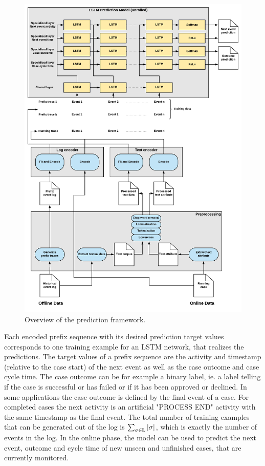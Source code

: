 \begin{figure}[!htbp]
	\includegraphics[width=\textwidth]{figures/framework}
	\caption{Overview of the prediction framework.}
	\label{fig:framework}
\end{figure}

Each encoded prefix sequence with its desired prediction target values corresponds to one training example for an LSTM network, that realizes the predictions. 
The target values of a prefix sequence are the activity and timestamp (relative to the case start) of the next event as well as the case outcome and case cycle time.
The case outcome can be for example a binary label, ie. a label telling if the case is successful or has failed or if it has been approved or declined.
In some applications the case outcome is defined by the final event of a case.
For completed cases the next activity is an artificial "PROCESS END" activity with the same timestamp as the final event.
The total number of training examples that can be generated out of the log is $\sum_{\sigma \in \mathbb{L}}|\sigma|$, which is exactly the number of events in the log.
In the online phase, the model can be used to predict the next event, outcome and cycle time of new unseen and unfinished cases, that are currently monitored.


